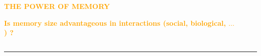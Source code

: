 \documentclass[usenames,dvipsnames,t]{beamer}
\begin{document}
\begin{columns}
    \begin{column}{.7\linewidth}
    \vspace{1.5cm}

    \centering
    \textbf{\textcolor{orange}{\fontsize{110}{120} \selectfont THE POWER OF MEMORY}}
    \vspace{0.7cm}

    \textbf{\Large\textcolor{orange}{Is memory size advantageous in interactions (social,
    biological, $\dots$) ?}}
    \end{column}
    \begin{column}{.2\linewidth}
        
        \begin{center}
            
        \end{center}
        \end{column}

    \begin{column}{.02\linewidth}
    \end{column}
\end{columns}
\vspace{1cm}

\hrule height 3pt
\vspace{1cm}
\end{document}

